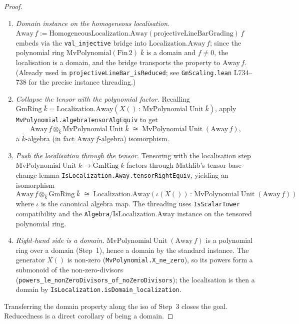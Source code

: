 \begin{proof}
  \begin{enumerate}
  \item \emph{Domain instance on the homogeneous localisation.}
    \(\mathrm{Away}\,f := \mathrm{HomogeneousLocalization.Away}(\mathrm{projectiveLineBarGrading})\,f\)
    embeds via the \texttt{val\_injective} bridge into
    \(\mathrm{Localization.Away}\,f\); since the polynomial ring
    \(\mathrm{MvPolynomial}(\mathrm{Fin}\,2)\;\overline{k}\) is a domain
    and \(f \ne 0\), the localisation is a domain, and the bridge
    transports the property to \(\mathrm{Away}\,f\). (Already used in
    \texttt{projectiveLineBar\_isReduced}; see
    \texttt{GmScaling.lean} L734--738 for the precise instance
    threading.)
  \item \emph{Collapse the tensor with the polynomial factor.}
    Recalling
    \(\mathrm{GmRing}\;\overline{k}
       = \mathrm{Localization.Away}(X()\,:\,\mathrm{MvPolynomial}\;\mathrm{Unit}\;\overline{k})\),
    apply \texttt{MvPolynomial.algebraTensorAlgEquiv} to get
    \[
      \mathrm{Away}\,f \otimes_{\overline{k}} \mathrm{MvPolynomial}\;\mathrm{Unit}\;\overline{k}
      \;\cong\;
      \mathrm{MvPolynomial}\;\mathrm{Unit}\;(\mathrm{Away}\,f),
    \]
    a \(\overline{k}\)-algebra (in fact \(\mathrm{Away}\,f\)-algebra)
    isomorphism.
  \item \emph{Push the localisation through the tensor.}
    Tensoring with the localisation step
    \(\mathrm{MvPolynomial}\;\mathrm{Unit}\;\overline{k} \to \mathrm{GmRing}\;\overline{k}\)
    factors through Mathlib's tensor-base-change lemma
    \texttt{IsLocalization.Away.tensorRightEquiv}, yielding an
    isomorphism
    \[
      \mathrm{Away}\,f \otimes_{\overline{k}} \mathrm{GmRing}\;\overline{k}
      \;\cong\;
      \mathrm{Localization.Away}(\iota(X())\,:\,\mathrm{MvPolynomial}\;\mathrm{Unit}\;(\mathrm{Away}\,f))
    \]
    where \(\iota\) is the canonical algebra map. The threading uses
    \texttt{IsScalarTower} compatibility and the
    \texttt{Algebra}/\(\mathrm{IsLocalization.Away}\) instance on the
    tensored polynomial ring.
  \item \emph{Right-hand side is a domain.}
    \(\mathrm{MvPolynomial}\;\mathrm{Unit}\;(\mathrm{Away}\,f)\) is a
    polynomial ring over a domain (Step~1), hence a domain by the
    standard instance. The generator \(X()\) is non-zero
    (\texttt{MvPolynomial.X\_ne\_zero}), so its powers form a
    submonoid of the non-zero-divisors
    (\texttt{powers\_le\_nonZeroDivisors\_of\_noZeroDivisors}); the
    localisation is then a domain by
    \texttt{IsLocalization.isDomain\_localization}.
  \end{enumerate}

  Transferring the domain property along the iso of Step~3 closes the
  goal. Reducedness is a direct corollary of being a domain.
\end{proof}

